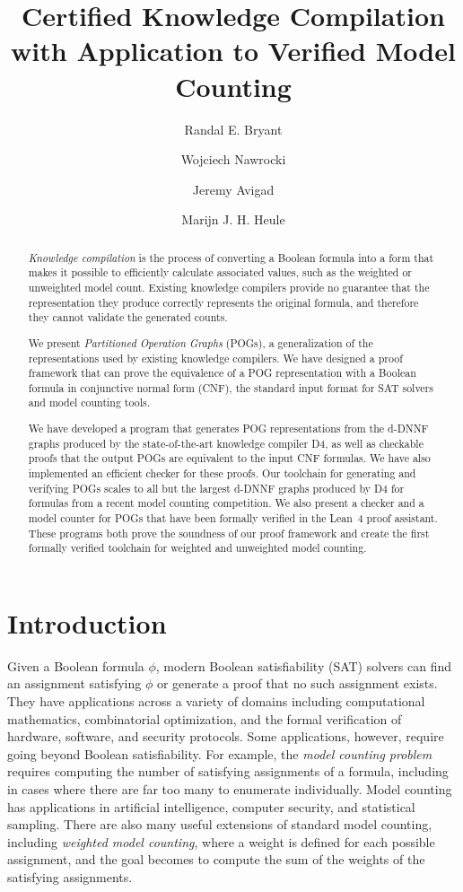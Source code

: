\documentclass[letterpaper,USenglish,cleveref, autoref, thm-restate]{lipics-v2021}
\title{Certified Knowledge Compilation \\ with Application to Verified Model Counting}
\author{Randal E. Bryant}{Computer Science Department, Carnegie Mellon University, Pittsburgh, PA 15213 USA}{rebryant@cmu.edu}{https://orcid.org/0000-0001-5024-6613}{Supported by NSF grant CCF-2108521}
\author{Wojciech Nawrocki}{Department of Philosophy, Carnegie Mellon University}{wjnawrock@cmu.edu}{https://orcid.org/0000-0002-8839-0618}{}
\author{Jeremy Avigad}{Department of Philosophy, Carnegie Mellon University}{avigad@cmu.edu}{https://orcid.org/0000-0003-1275-315X}{}
\author{Marijn J. H. Heule}{Computer Science Department, Carnegie Mellon University}{marijn@cmu.edu}{https://orcid.org/0000-0002-5587-8801}{Supported by NSF grant CCF-2108521}
\newcommand{\progname}[1]{\textsc{#1}}
\newcommand{\dfour}{\progname{D4}}
\newcommand{\lean}{Lean~4}
\begin{document}
\maketitle

\begin{abstract}

\emph{Knowledge compilation} is the process of converting a Boolean
formula into a form that makes it possible to efficiently calculate
associated values, such as the weighted or unweighted model
count. Existing knowledge compilers
provide no guarantee that the representation they produce
correctly represents the original formula, and therefore they cannot validate the generated counts.

We present \emph{Partitioned Operation Graphs} (POGs), a generalization
of the representations used by existing knowledge compilers.
We have designed a proof framework that can prove the equivalence of a
POG representation with a Boolean formula in conjunctive normal form (CNF),
the standard input format for SAT solvers and model counting tools.

We have developed a program that generates POG representations from
the d-DNNF graphs produced by the state-of-the-art knowledge compiler
\dfour, as well as checkable proofs that the output POGs
are equivalent to the input CNF formulas.  We have also implemented an
efficient checker for these proofs. Our toolchain
for generating and verifying POGs scales to all but the largest d-DNNF
graphs produced by \dfour{} for formulas from a recent model counting
competition. We also present a checker and a model counter for POGs that have
been formally verified in the \lean{} proof assistant.  These programs both prove the soundness of our proof framework and
create the first formally verified toolchain for weighted and unweighted model counting.
\end{abstract}

\section{Introduction}

Given a Boolean formula $\phi$, modern Boolean satisfiability (SAT) solvers can
find an assignment satisfying $\phi$ or generate a proof that no
such assignment exists.  They have applications across a variety of
domains including computational mathematics, combinatorial
optimization, and the formal verification of hardware, software, and
security protocols.  Some applications, however, require going
beyond Boolean satisfiability.  For example, the {\em model
  counting problem} requires computing the number of satisfying
assignments of a formula, including in cases where there are far too many
to enumerate individually.  Model counting has
applications in artificial intelligence, computer security, and
statistical sampling.  There are also many useful extensions of standard model counting,
including {\em
  weighted model counting}, where a weight is defined for
each possible assignment, and the goal becomes to compute the sum of the weights
of the satisfying assignments.
\end{document}
